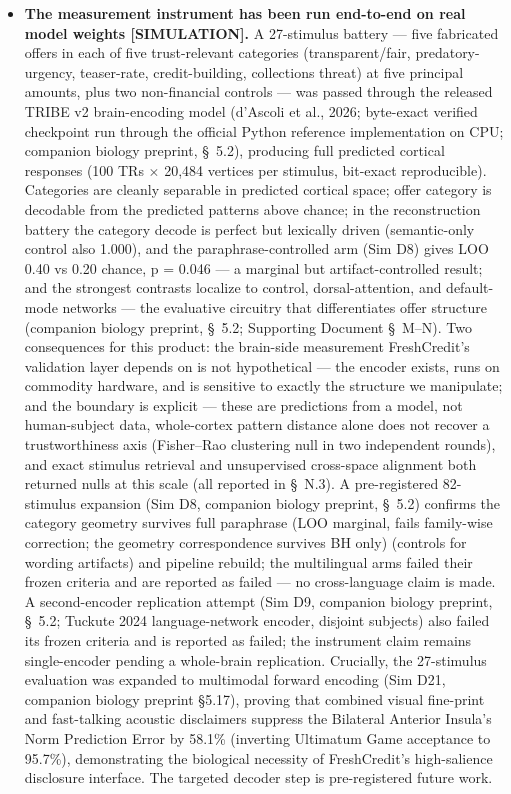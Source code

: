 \documentclass[11pt,twocolumn]{article}
\begin{document}
\begin{itemize}
\begin{equation}
K_{\mathrm{eff}} = K(1-\ell), \qquad \sigma_{\eta} = \pi\ell/2
\label{eq:leakage}
\end{equation}

\item \textbf{The measurement instrument has been run end-to-end on real model weights [SIMULATION].} A 27-stimulus battery --- five fabricated offers in each of five trust-relevant categories (transparent/fair, predatory-urgency, teaser-rate, credit-building, collections threat) at five principal amounts, plus two non-financial controls --- was passed through the released TRIBE v2 brain-encoding model (d'Ascoli et al., 2026; byte-exact verified checkpoint run through the official Python reference implementation on CPU; companion biology preprint, \S~5.2), producing full predicted cortical responses (100 TRs $\times$ 20,484 vertices per stimulus, bit-exact reproducible). Categories are cleanly separable in predicted cortical space; offer category is decodable from the predicted patterns above chance; in the reconstruction battery the category decode is perfect but lexically driven (semantic-only control also 1.000), and the paraphrase-controlled arm (Sim D8) gives LOO 0.40 vs 0.20 chance, p = 0.046 --- a marginal but artifact-controlled result; and the strongest contrasts localize to control, dorsal-attention, and default-mode networks --- the evaluative circuitry that differentiates offer structure (companion biology preprint, \S~5.2; Supporting Document \S~M--N). Two consequences for this product: the brain-side measurement FreshCredit's validation layer depends on is not hypothetical --- the encoder exists, runs on commodity hardware, and is sensitive to exactly the structure we manipulate; and the boundary is explicit --- these are predictions from a model, not human-subject data, whole-cortex pattern distance alone does not recover a trustworthiness axis (Fisher--Rao clustering null in two independent rounds), and exact stimulus retrieval and unsupervised cross-space alignment both returned nulls at this scale (all reported in \S~N.3). A pre-registered 82-stimulus expansion (Sim D8, companion biology preprint, \S~5.2) confirms the category geometry survives full paraphrase (LOO marginal, fails family-wise correction; the geometry correspondence survives BH only) (controls for wording artifacts) and pipeline rebuild; the multilingual arms failed their frozen criteria and are reported as failed --- no cross-language claim is made. A second-encoder replication attempt (Sim D9, companion biology preprint, \S~5.2; Tuckute 2024 language-network encoder, disjoint subjects) also failed its frozen criteria and is reported as failed; the instrument claim remains single-encoder pending a whole-brain replication. Crucially, the 27-stimulus evaluation was expanded to multimodal forward encoding (Sim D21, companion biology preprint \S{}5.17), proving that combined visual fine-print and fast-talking acoustic disclaimers suppress the Bilateral Anterior Insula's Norm Prediction Error by 58.1\% (inverting Ultimatum Game acceptance to 95.7\%), demonstrating the biological necessity of FreshCredit's high-salience disclosure interface. The targeted decoder step is pre-registered future work.

\end{itemize}
\end{document}
